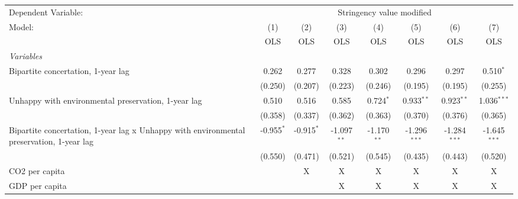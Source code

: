 
\begingroup
\centering
\begin{tabular}{lccccccc}
   \toprule
   Dependent Variable: & \multicolumn{7}{c}{Stringency value modified}\\
   Model:                                                                                   & (1)          & (2)          & (3)           & (4)           & (5)            & (6)            & (7)\\  
                                                                                            &  OLS         & OLS          & OLS           & OLS           & OLS            & OLS            & OLS\\  
   \midrule
   \emph{Variables}\\
   Bipartite concertation, 1-year lag                                                       & 0.262        & 0.277        & 0.328         & 0.302         & 0.296          & 0.297          & 0.510$^{*}$\\   
                                                                                            & (0.250)      & (0.207)      & (0.223)       & (0.246)       & (0.195)        & (0.195)        & (0.255)\\   
   Unhappy with environmental preservation, 1-year lag                                      & 0.510        & 0.516        & 0.585         & 0.724$^{*}$   & 0.933$^{**}$   & 0.923$^{**}$   & 1.036$^{***}$\\   
                                                                                            & (0.358)      & (0.337)      & (0.362)       & (0.363)       & (0.370)        & (0.376)        & (0.365)\\   
   Bipartite concertation, 1-year lag x Unhappy with environmental preservation, 1-year lag & -0.955$^{*}$ & -0.915$^{*}$ & -1.097$^{**}$ & -1.170$^{**}$ & -1.296$^{***}$ & -1.284$^{***}$ & -1.645$^{***}$\\   
                                                                                            & (0.550)      & (0.471)      & (0.521)       & (0.545)       & (0.435)        & (0.443)        & (0.520)\\   
   CO2 per capita                                                                           &              & X            & X             & X             & X              & X              & X\\  
   GDP per capita                                                                           &              &              & X             & X             & X              & X              & X\\  

\end{tabular}
